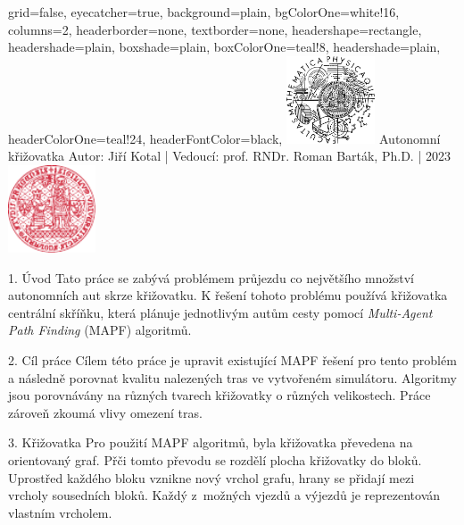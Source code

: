 \documentclass[portrait,fontscale=0.26,paperwidth=842mm,paperheight=1185mm]{baposter.cls}
\begin{document}
	\color{black!80} %
	\begin{poster}{grid=false,
		eyecatcher=true,
		background=plain,
		bgColorOne=white!16, %
		columns=2,
		headerborder=none,
		textborder=none,
		headershape=rectangle,
		headershade=plain,
		boxshade=plain,
		boxColorOne=teal!8,
		headershade=plain,
		headerColorOne=teal!24, %
		headerFontColor=black,
	}%
	{\includegraphics[height=7em]{logos/mff-black}}
	{Autonomní křižovatka}
	{\vspace{1ex} Autor: Jiří Kotal | Vedoucí: prof. RNDr. Roman Barták, Ph.D. | 2023}
	{\includegraphics[height=7em]{logos/uk-red}}


%
%

		\begin{posterbox}[column=0,name=uvod]{1. Úvod}
			Tato práce se zabývá problémem průjezdu co největšího množství autonomních aut skrze křižovatku.
			K řešení tohoto problému používá křižovatka centrální skříňku,
			která plánuje jednotlivým autům cesty pomocí \textit{Multi-Agent Path Finding} (MAPF) algoritmů.
		\end{posterbox}

		\begin{posterbox}[column=0, name=cile, below=uvod, headerColorOne=purple!24, boxColorOne=purple!8]{2. Cíl práce}
			Cílem této práce je upravit existující MAPF řešení pro tento problém a
			následně porovnat kvalitu nalezených tras ve vytvořeném simulátoru.
			Algoritmy jsou porovnávány na různých tvarech křižovatky o různých velikostech.
			Práce zároveň zkoumá vlivy omezení tras.
		\end{posterbox}

		\begin{posterbox}[column=0, name=krizovatka, below=cile]{3. Křižovatka}
			Pro použití MAPF algoritmů, byla křižovatka převedena na orientovaný graf.
			Přči tomto převodu se rozdělí plocha křižovatky do bloků.
			Uprostřed každého bloku vznikne nový vrchol grafu, hrany se přidají mezi vrcholy sousedních bloků.
			Každý z~možných vjezdů a výjezdů je reprezentován vlastním vr\-cho\-lem.


\end{posterbox}
\end{poster}
\end{document}

